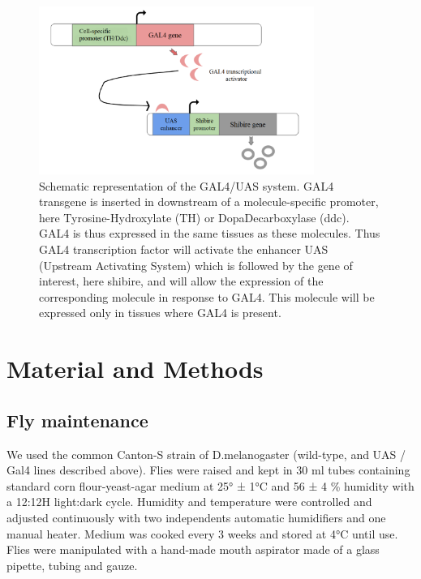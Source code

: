 \documentclass[a4paper, 12pt]{article}
\begin{document}
	\begin{figure}
		\centering
		\includegraphics[width=0.8\textwidth]{images/guas}
		\caption{Schematic representation of the GAL4/UAS system. 
			GAL4 transgene is inserted in downstream of a molecule-specific promoter, here Tyrosine-Hydroxylate (TH) or DopaDecarboxylase (ddc). GAL4 is thus expressed in the same tissues as these molecules. Thus GAL4 transcription factor will activate the enhancer UAS (Upstream Activating System) which is followed by the gene of interest, here shibire, and will allow the expression of the corresponding molecule in response to GAL4. This molecule will be expressed only in tissues where GAL4 is present.}
		\label{fig:GUAS}
	\end{figure}

	
	

	
	\clearpage
	\section{Material and Methods}
	
	\bigskip

	\subsection{Fly maintenance}
	
	We used the common Canton-S strain of D.melanogaster (wild-type, and UAS / Gal4 lines described above). Flies were raised and kept in 30 ml tubes containing standard corn flour-yeast-agar medium at 25° ± 1°C and 56 ± 4 \% humidity with a 12:12H light:dark cycle. Humidity and temperature were controlled and adjusted continuously with two independents automatic humidifiers and one manual heater. Medium was cooked every 3 weeks and stored at 4°C until use. Flies were manipulated with a hand-made mouth aspirator made of a glass pipette, tubing and gauze.
	
\end{document}
